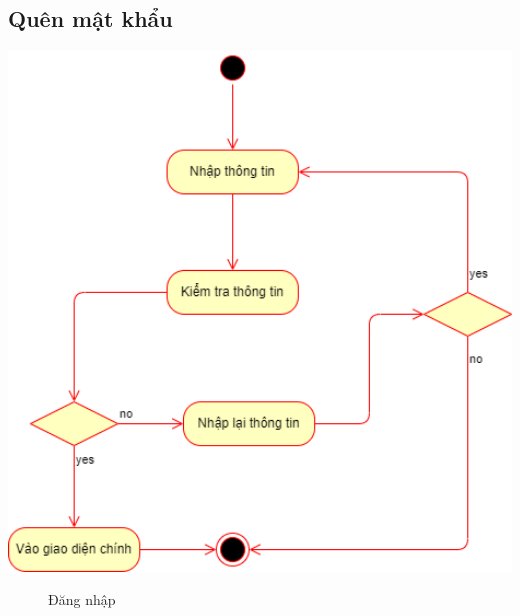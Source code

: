 \subsection{Quên mật khẩu}
  \begin{center}
    \includegraphics[width=1.1\textwidth]{image/activity/login.png}
    \begin{figure}
      \centering
      \caption{Đăng nhập}
    \end{figure}
  \end{center}
